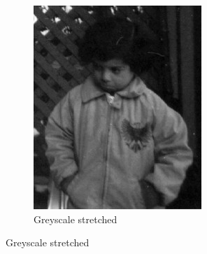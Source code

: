 \documentclass[12pt]{article}
\begin{document}
\begin{figure}[H]
\begin{subfigure}{.45\textwidth}
    \includegraphics[width=\linewidth]{./img/out.jpg}
    \caption{Greyscale stretched}
  \end{subfigure}
\end{figure}
\end{document}
